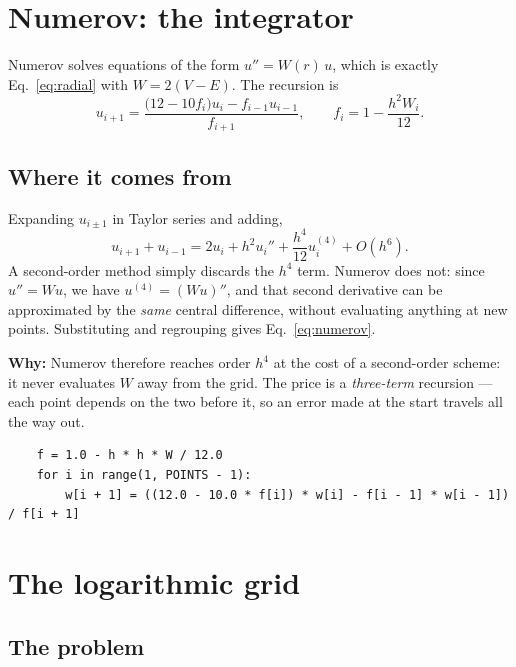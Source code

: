 \documentclass[11pt,a4paper]{article}
\newcommand{\why}[1]{\medskip\noindent\textbf{Why:} #1\medskip}
\begin{document}
\section{Numerov: the integrator}
\label{sec:numerov}

Numerov solves equations of the form $u'' = W(r)\,u$, which is exactly
Eq.~\eqref{eq:radial} with $W = 2(V-E)$. The recursion is
\begin{equation}
  u_{i+1} = \frac{\bigl(12 - 10 f_i\bigr)u_i - f_{i-1}u_{i-1}}{f_{i+1}},
  \qquad f_i = 1 - \frac{h^2 W_i}{12}.
  \label{eq:numerov}
\end{equation}

\subsection*{Where it comes from}

Expanding $u_{i\pm1}$ in Taylor series and adding,
\[
  u_{i+1} + u_{i-1} = 2u_i + h^2 u_i'' + \frac{h^4}{12}u_i^{(4)} + O(h^6).
\]
A second-order method simply discards the $h^4$ term. Numerov does not: since
$u'' = Wu$, we have $u^{(4)} = (Wu)''$, and that second derivative can be
approximated by the \emph{same} central difference, without evaluating anything
at new points. Substituting and regrouping gives Eq.~\eqref{eq:numerov}.

\why{Numerov therefore reaches order $h^4$ at the cost of a second-order
scheme: it never evaluates $W$ away from the grid. The price is a
\emph{three-term} recursion --- each point depends on the two before it, so an
error made at the start travels all the way out.}

\begin{lstlisting}
    f = 1.0 - h * h * W / 12.0
    for i in range(1, POINTS - 1):
        w[i + 1] = ((12.0 - 10.0 * f[i]) * w[i] - f[i - 1] * w[i - 1]) / f[i + 1]
\end{lstlisting}

\section{The logarithmic grid}
\label{sec:loggrid}
\label{sec:log}

\subsection{The problem}
\end{document}
